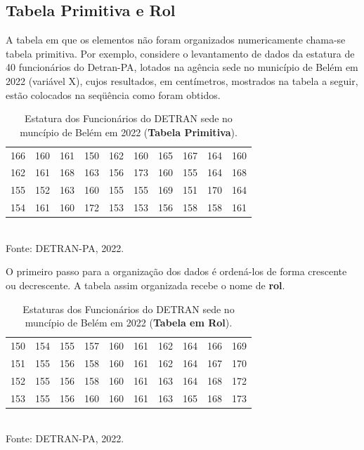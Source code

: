 \subsection{Tabela Primitiva e Rol}


A tabela em que os elementos não foram organizados numericamente chama-se tabela primitiva. Por exemplo, considere o levantamento de dados da estatura de 40 funcionários do Detran-PA, lotados na agência sede no município de Belém em 2022 (variável X), cujos resultados, em centímetros, mostrados na tabela a seguir, estão colocados na seqüência como foram obtidos.


\begin{table}[!htb]
    \centering
    {
    \caption{Estatura dos Funcionários do DETRAN sede no muncípio de Belém em 2022 (\textbf{Tabela Primitiva}).}
    \label{estatura}
    \vspace{0.2cm}
\begin{tabular}{c|c|c|c|c|c|c|c|c|c}
  \hline\hline
  166 & 160 & 161 & 150 & 162 & 160 & 165 & 167 & 164 & 160 \\
  162 & 161 & 168 & 163 & 156 & 173 & 160 & 155 & 164 & 168 \\
  155 & 152 & 163 & 160 & 155 & 155 & 169 & 151 & 170 & 164 \\
  154 & 161 & 160 & 172 & 153 & 153 & 156 & 158 & 158 & 161 \\
  \hline\hline
\end{tabular}}
\\
\hspace{-5.5cm} Fonte: DETRAN-PA, 2022.
\end{table}

\newpage

O primeiro passo para a organização dos dados é ordená-los de forma crescente ou decrescente. A tabela assim organizada recebe o nome de \textbf{rol}.


\begin{table}[!htb]
    \centering
    {
    \caption{Estaturas dos Funcionários do DETRAN sede no muncípio de Belém em 2022 (\textbf{Tabela em Rol}).}
    \label{estatura2}
    \vspace{0.2cm}
\begin{tabular}{c|c|c|c|c|c|c|c|c|c}
  \hline\hline
  150 & 154 & 155 & 157 & 160 & 161 & 162 & 164 & 166 & 169 \\
  151 & 155 & 156 & 158 & 160 & 161 & 162 & 164 & 167 & 170 \\
  152 & 155 & 156 & 158 & 160 & 161 & 163 & 164 & 168 & 172 \\
  153 & 155 & 156 & 160 & 160 & 161 & 163 & 165 & 168 & 173 \\
  \hline\hline
\end{tabular}}
\\
\hspace{-5.4cm} Fonte: DETRAN-PA, 2022.
\end{table}




